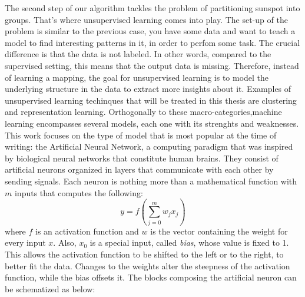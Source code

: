 \bigbreak
\noindent The second step of our algorithm tackles the problem of partitioning sunspot into groups. That's where unsupervised learning comes into play. The set-up of the problem is similar to the previous case, you have some data and want to teach a model to find interesting patterns in it, in order to perfom some task. The crucial difference is that the data is not labeled. In other words, compared to the supervised setting, this means that the output data is missing. Therefore, instead of learning a mapping, the goal for unsupervised learning is to model the underlying structure in the data to extract more insights about it. Examples of unsupervised learning techinques that will be treated in this thesis are clustering and representation learning.
\bigbreak
\noindent Orthogonally to these macro-categories,machine learning encompasses several models, each one with its strenghts and weaknesses. This work focuses on the type of model that is most popular at the time of writing: the Artificial Neural Network, a computing paradigm that was inspired by biological neural networks that constitute human brains. They consist of artificial neurons organized in layers that communicate with each other by sending signals. Each neuron is nothing more than a mathematical function with $m$ inputs that computes the following:
\begin{equation}
y = f \left(\sum_{j=0}^{m} w_{j}x_{j}\right)
\end{equation}
where $f$ is an activation function and $w$ is the vector containing the weight for every input $x$. Also, $x_0$ is a special input, called \textit{bias}, whose value is fixed to 1. This allows the activation function to be shifted to the left or to the right, to better fit the data. Changes to the weights alter the steepness of the activation function, while the bias offsets it. The blocks composing the artificial neuron can be schematized as below: \\
